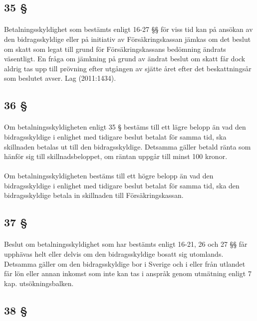 \documentclass[a4paper,notitlepage,openany,10pt]{book}
\begin{document}
\subsection*{35 §}
\paragraph*{}
Betalningsskyldighet som bestämts enligt 16-27 §§ för viss tid kan på ansökan av den bidragsskyldige eller på initiativ av Försäkringskassan jämkas om det beslut om skatt som legat till grund för Försäkringskassans bedömning ändrats väsentligt. En fråga om jämkning på grund av ändrat beslut om skatt får dock aldrig tas upp till prövning efter utgången av sjätte året efter det beskattningsår som beslutet avser.
Lag (2011:1434).
\subsection*{36 §}
\paragraph*{}
Om betalningsskyldigheten enligt 35 § bestäms till ett lägre belopp än vad den bidragsskyldige i enlighet med tidigare beslut betalat för samma tid, ska skillnaden betalas ut till den bidragsskyldige. Detsamma gäller betald ränta som hänför sig till skillnadsbeloppet, om räntan uppgår till minst 100 kronor.
\paragraph*{}
Om betalningsskyldigheten bestäms till ett högre belopp än vad den bidragsskyldige i enlighet med tidigare beslut betalat för samma tid, ska den bidragsskyldige betala in skillnaden till Försäkringskassan.
\subsection*{37 §}
\paragraph*{}
Beslut om betalningsskyldighet som har bestämts enligt 16-21, 26 och 27 §§ får upphävas helt eller delvis om den bidragsskyldige bosatt sig utomlands. Detsamma gäller om den bidragsskyldige bor i Sverige och i eller från utlandet får lön eller annan inkomst som inte kan tas i anspråk genom utmätning enligt 7 kap. utsökningsbalken.
\subsection*{38 §}
\end{document}
